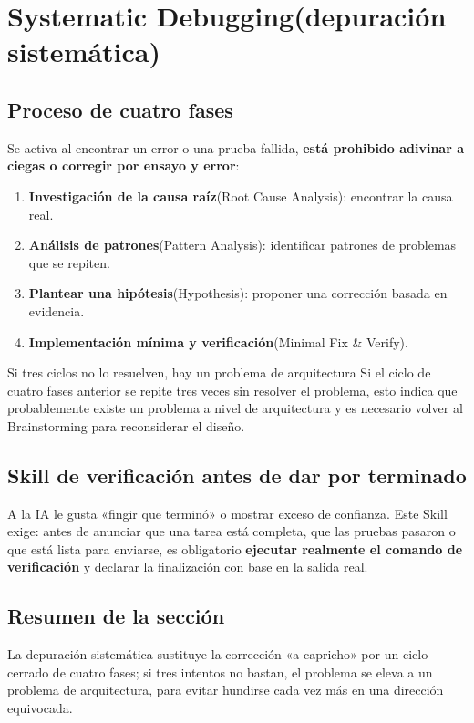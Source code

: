 \section{Systematic Debugging(depuración sistemática)}

\subsection{Proceso de cuatro fases}

Se activa al encontrar un error o una prueba fallida, \textbf{está prohibido adivinar a ciegas o corregir por ensayo y error}:

\begin{enumerate}
    \item \textbf{Investigación de la causa raíz}(Root Cause Analysis): encontrar la causa real.
    \item \textbf{Análisis de patrones}(Pattern Analysis): identificar patrones de problemas que se repiten.
    \item \textbf{Plantear una hipótesis}(Hypothesis): proponer una corrección basada en evidencia.
    \item \textbf{Implementación mínima y verificación}(Minimal Fix \& Verify).
\end{enumerate}

\begin{warningbox}{Si tres ciclos no lo resuelven, hay un problema de arquitectura}
Si el ciclo de cuatro fases anterior se repite tres veces sin resolver el problema, esto indica que probablemente existe un problema a nivel de arquitectura y es necesario volver al Brainstorming para reconsiderar el diseño.
\end{warningbox}

\subsection{Skill de verificación antes de dar por terminado}

A la IA le gusta «fingir que terminó» o mostrar exceso de confianza. Este Skill exige: antes de anunciar que una tarea está completa, que las pruebas pasaron o que está lista para enviarse, es obligatorio \textbf{ejecutar realmente el comando de verificación} y declarar la finalización con base en la salida real.

\subsection{Resumen de la sección}

La depuración sistemática sustituye la corrección «a capricho» por un ciclo cerrado de cuatro fases; si tres intentos no bastan, el problema se eleva a un problema de arquitectura, para evitar hundirse cada vez más en una dirección equivocada.
